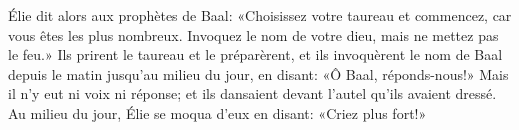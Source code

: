 Élie dit alors aux prophètes de Baal:
	«Choisissez votre taureau et commencez, car vous êtes les plus nombreux.
	Invoquez le nom de votre dieu, mais ne mettez pas le feu.»
Ils prirent le taureau et le préparèrent,
	et ils invoquèrent le nom de Baal depuis le matin jusqu’au milieu du jour, en disant:
	«Ô Baal, réponds-nous!»
Mais il n’y eut ni voix ni réponse;
	et ils dansaient devant l’autel qu’ils avaient dressé.
Au milieu du jour, Élie se moqua d’eux en disant: «Criez plus fort!»
